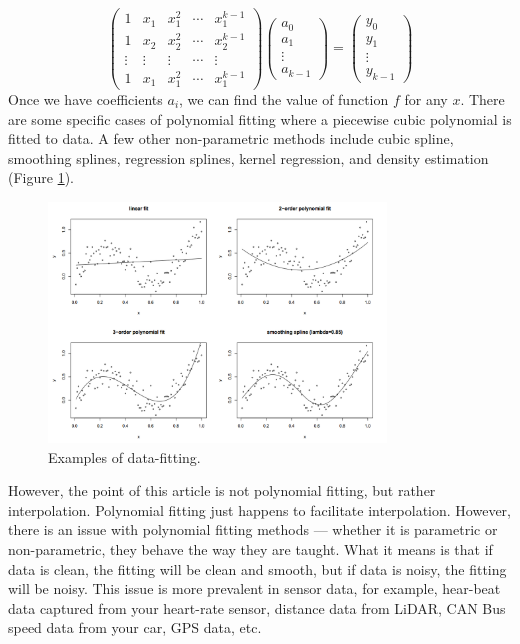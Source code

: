 \documentclass[onecolumn]{article}
\begin{document}
\[
\begin{pmatrix}1 & x_1 & x_1^2 & \cdots & x_1^{k-1}\\1 & x_2 & x_2^2 & \cdots & x_2^{k-1} \\ \vdots & \vdots & \vdots & \cdots & \vdots \\ 1 & x_1 & x_1^2 & \cdots & x_1^{k-1}
\end{pmatrix}
\begin{pmatrix}
a_0\\a_1 \\ \vdots \\ a_{k-1}
\end{pmatrix} = \begin{pmatrix} y_0 \\ y_1 \\ \vdots \\ y_{k-1}\end{pmatrix}
\] Once we have coefficients \(a_i\), we can find the value of function
\(f\) for any \(x\). There are some specific cases of polynomial fitting
where a piecewise cubic polynomial is fitted to data. A few other
non-parametric methods include cubic spline, smoothing splines,
regression splines, kernel regression, and density estimation
\citep{hastie2009elements} (Figure \ref{datafitting}).

\begin{figure}
\centering
\includegraphics[width=0.80000\textwidth]{fitting_methods.png}
\caption{Examples of data-fitting.\label{datafitting}}
\end{figure}

However, the point of this article is not polynomial fitting, but rather
interpolation. Polynomial fitting just happens to facilitate
interpolation. However, there is an issue with polynomial fitting
methods --- whether it is parametric or non-parametric, they behave the
way they are taught. What it means is that if data is clean, the fitting
will be clean and smooth, but if data is noisy, the fitting will be
noisy. This issue is more prevalent in sensor data, for example,
hear-beat data captured from your heart-rate sensor, distance data from
LiDAR, CAN Bus speed data from your car, GPS data, etc.
\end{document}
